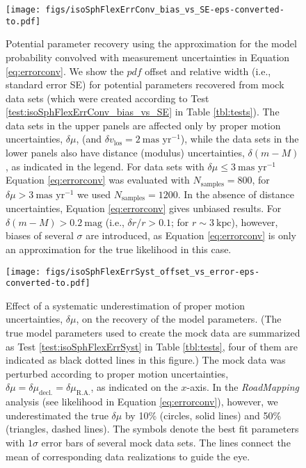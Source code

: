 \documentclass[iop,revtex4,numberedappendix,appendixfloats]{emulateapj}
\newcommand{\pdf}{\ensuremath{pdf}}
\newcommand{\RM}{{\sl RoadMapping}}
\begin{document}
\begin{figure}[!htbp]
\centering
\texttt{[image: figs/isoSphFlexErrConv\_bias\_vs\_SE-eps-converted-to.pdf]}
\caption{Potential parameter recovery using the approximation for the model probability convolved with measurement uncertainties in Equation \eqref{eq:errorconv}. We show the \pdf{} offset and relative width (i.e., standard error SE) for potential parameters recovered from mock data sets (which were created according to Test \ref{test:isoSphFlexErrConv_bias_vs_SE} in Table \ref{tbl:tests}). The data sets in the upper panels are affected only by proper motion uncertainties, $\delta \mu$, (and $\delta v_\text{los}=2~\text{mas yr}^{-1}$), while the data sets in the lower panels also have distance (modulus) uncertainties, $\delta (m-M)$, as indicated in the legend. For data sets with $\delta \mu \leq 3 ~\text{mas yr}^{-1}$ Equation \eqref{eq:errorconv} was evaluated with $N_\text{samples}=800$, for $\delta \mu > 3~\text{mas yr}^{-1}$ we used $N_\text{samples}=1200$. In the absence of distance uncertainties, Equation \eqref{eq:errorconv} gives unbiased results. For $\delta(m-M) > 0.2~\text{mag}$ (i.e., $\delta r/r > 0.1$; for $r \sim 3~\text{kpc}$), however, biases of several $\sigma$ are introduced, as Equation \eqref{eq:errorconv} is only an approximation for the true likelihood in this case.}
\label{fig:isoSphFlexErrConv_bias_vs_SE}
\end{figure}

\begin{figure}[!htbp]
\centering
\texttt{[image: figs/isoSphFlexErrSyst\_offset\_vs\_error-eps-converted-to.pdf]}
\caption{Effect of a systematic underestimation of proper motion uncertainties, $\delta \mu$, on the recovery of the model parameters. (The true model parameters used to create the mock data are summarized as Test \ref{test:isoSphFlexErrSyst} in Table \ref{tbl:tests}, four of them are indicated as black dotted lines in this figure.) The mock data was perturbed according to proper motion uncertainties, $\delta \mu = \delta \mu_\text{decl.} = \delta \mu_\text{R.A.}$, as indicated on the $x$-axis. In the \RM{} analysis (see likelihood in Equation \eqref{eq:errorconv}), however, we underestimated the true $\delta \mu$ by 10\% (circles, solid lines) and 50\% (triangles, dashed lines). The symbols denote the best fit parameters with $1\sigma$ error bars of several mock data sets. The lines connect the mean of corresponding data realizations to guide the eye.}
\label{fig:isoSphFlexErrSyst}
\end{figure}
\end{document}
